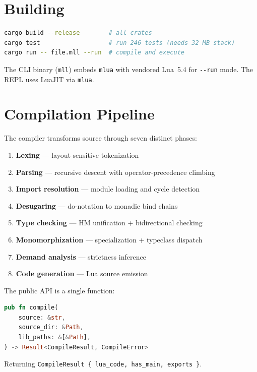 \documentclass[11pt,a4paper]{article}
\begin{document}
\section{Building}

\begin{lstlisting}[language=bash]
cargo build --release        # all crates
cargo test                   # run 246 tests (needs 32 MB stack)
cargo run -- file.mll --run  # compile and execute
\end{lstlisting}

The CLI binary (\texttt{mll}) embeds \texttt{mlua} with vendored Lua~5.4 for
\texttt{-{}-run} mode.  The REPL uses LuaJIT via \texttt{mlua}.

\section{Compilation Pipeline}

The compiler transforms source through seven distinct phases:

\begin{enumerate}[nosep]
  \item \textbf{Lexing} --- layout-sensitive tokenization
  \item \textbf{Parsing} --- recursive descent with operator-precedence climbing
  \item \textbf{Import resolution} --- module loading and cycle detection
  \item \textbf{Desugaring} --- do-notation to monadic bind chains
  \item \textbf{Type checking} --- HM unification + bidirectional checking
  \item \textbf{Monomorphization} --- specialization + typeclass dispatch
  \item \textbf{Demand analysis} --- strictness inference
  \item \textbf{Code generation} --- Lua source emission
\end{enumerate}

The public API is a single function:
\begin{lstlisting}[language=Rust]
pub fn compile(
    source: &str,
    source_dir: &Path,
    lib_paths: &[&Path],
) -> Result<CompileResult, CompileError>
\end{lstlisting}

Returning \texttt{CompileResult \{ lua\_code, has\_main, exports \}}.
\end{document}

